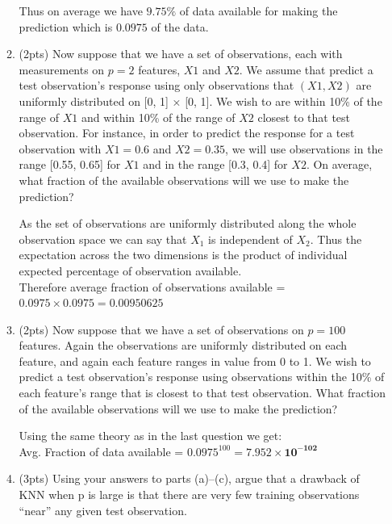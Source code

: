 \documentclass[a4paper]{article}
\theoremstyle{definition}
\newenvironment{soln}{
    \leavevmode\color{blue}\ignorespaces
}{}
\begin{document}
\begin{enumerate}
\begin{enumerate}
\begin{soln}
            Thus on average we have $\mathbf{9.75\%}$ of data available for making the prediction which is $\mathbf{0.0975}$ of the data.
            
        \end{soln}
	
	
	\item (2pts) Now suppose that we have a set of observations, each with measurements on $p =2$ features, $X1$ and $X2$. We assume that predict a test observation’s response using only observations that $(X1,X2)$ are uniformly distributed on [0, 1] × [0, 1]. We wish to are within 10\% of the range of $X1$ and within 10\% of the range of $X2$ closest to that test observation. For instance, in order to predict the response for a test observation with $X1 =0.6$ and $X2 =0.35$, we will use observations in the range [0.55, 0.65] for $X1$ and in the range [0.3, 0.4] for $X2$. On average, what fraction of the available observations will we use to make the prediction?
	
	\begin{soln}
            As the set of observations are uniformly distributed along the whole observation space we can say that $X_1$ is independent of $X_2$. Thus the expectation across the two dimensions is the product of individual expected percentage of observation available.\\
            Therefore average fraction of observations available = $0.0975\times 0.0975 = \mathbf{0.00950625}$
        \end{soln}
	
	\item (2pts) Now suppose that we have a set of observations on $p = 100$ features. Again the observations are uniformly distributed on each feature, and again each feature ranges in value from 0 to 1. We wish to predict a test observation’s response using observations within the 10\% of each feature’s range that is closest to that test observation. What fraction of the available observations will we use to make the prediction?
	
	\begin{soln}
            Using the same theory as in the last question we get:\\
            Avg. Fraction of data available  = $0.0975^{100} = \mathbf{7.952\times10^{-102}}$
        \end{soln}
	
	\item (3pts) Using your answers to parts (a)–(c), argue that a drawback of KNN when p is large is that there are very few training observations “near” any given test observation.
	

\end{enumerate}
\end{enumerate}
\end{document}
